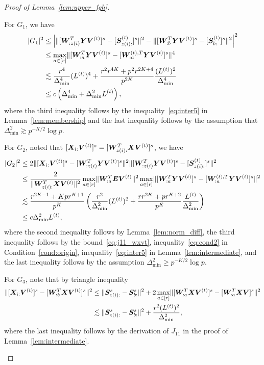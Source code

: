 \documentclass[lettersize,journal]{IEEEtran}
\theoremstyle{definition}
\theoremstyle{definition}
\newcommand{\of}[1]{\left(#1\right)}
\newcommand{\aabs}[1]{\left|#1\right|}
\begin{document}
\begin{proof}[Proof of Lemma~\ref{lem:upper_fgh}]
\begin{enumerate}
    For $G_1$, we have 
    \begin{align}
        |G_1|^2 &\leq \aabs{ \onormSize{}{ [ \mW_{:z(i)}^T \mY \mV^{(t)} ]^s - [ \mS_{z(i):}^{(t)}  ]^s}^2 - \onormSize{}{ [ \mW_{:b}^T \mY \mV^{(t)} ]^s -  [ \mS_{b:}^{(t)}  ]^s }^2 }^2 \\
        & \leq \max_{a \in [r]} \onormSize{}{ [ \mW_{:a}^T \mY \mV^{(t)} ]^s - [ \mW_{:a}^{(t),T} \mY \mV^{(t)}  ]^s}^4\\
        & \lesssim \frac{r^4}{\Delta_{\min}^4} (L^{(t)})^4 +  \frac{r^2 r^{4K} + p^2r^{2K+4}}{p^{2K}} \frac{(L^{(t)})^2}{\Delta_{\min}^4} \\
        & \leq c\of{\Delta_{\min}^4 +  \Delta_{\min}^2 L^{(t)}}, \label{eq:g1}
    \end{align}
    where the third inequality follows by the inequality~\eqref{eq:inter5} in Lemma~\ref{lem:membership} and the last inequality follows by the assumption that $\Delta_{\min}^2 \gtrsim p^{-K/2}\log p$.
    
    For $G_2$, noted that $[\bm X_{i:} \bm{V}^{(t)}]^s = [ \bm{W}_{z(i):}^T\bm X \bm{V}^{(t)}]^s$, we have 
    \begin{align}
        |G_2|^2 &\leq 2\onormSize{}{ [\mX_{i:} \mV^{(t)}]^s  -  [  \mW_{:z(i)}^T \mY \mV^{(t)} ]^s}^2 \onormSize{}{ [  \mW_{:z(i)}^T \mY \mV^{(t)} ]^s -  [  \mS_{z(i):}^{(t)}  ]^s }^2 \\
        & \leq \frac{2}{ \onormSize{}{ \mW_{z(i):}^T\mX \mV^{(t)}}^2} \max_{a \in [r]}\onormSize{}{ \mW_{:a}^T \mE \mV^{(t)} }^2 \max_{a \in [r]} \onormSize{}{ [  \mW_{:a}^T \mY \mV^{(t)} ]^s -  [   \mW_{:a}^{(t),T} \mY \mV^{(t)}  ]^s}^2\\
        & \lesssim \frac{ r^{2K-1} + K p r^{K+1} }{p^{K}} \of{ \frac{r^2}{\Delta_{\min}^2} (L^{(t)})^2 + \frac{r r^{2K} + pr^{K+2}}{p^{K}} \frac{L^{(t)}}{\Delta_{\min}^2} }\\
        & \leq c \Delta_{\min}^2 L^{(t)},\label{eq:g2}
    \end{align}
    where the second inequality follows by Lemma~\ref{lem:norm_diff}, the third inequality follows by the bound~\eqref{eq:j11_wxvt}, inequality~\eqref{eq:cond2} in Condition~\ref{cond:origin}, inequality~\eqref{eq:inter5} in Lemma~\ref{lem:intermediate},  and the last inequality follows by the assumption $\Delta_{\min}^2 \geq p^{-K/2} \log p$.
    
    For $G_3$, note that by triangle inequality
    \begin{align}
        \onormSize{}{[\mX_{i:} \mV^{(t)}]^s  -  [  \mW_{:b}^T \mX \mV^{(t)} ]^s}^2 &\leq \onormSize{}{\mS_{z(i):}^s - \mS_{b:}^s}^2 + 2\max_{a \in [r]}\onormSize{}{[\mW_{:a}^T\mX \mV^{(t)}]^s - [\mW_{:a}^T\mX \mV]^s }^2\\
        & \lesssim \onormSize{}{\mS_{z(i):}^s - \mS_{b:}^s}^2 + \frac{r^2 (L^{(t)})^2}{\Delta_{\min}^2}, \label{eq:g3xv_wxv}
    \end{align}
    where the last inequality follows by the derivation of $J_{11}$ in the proof of Lemma~\ref{lem:intermediate}.


\end{enumerate}
\end{proof}
\end{document}
